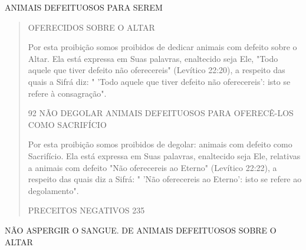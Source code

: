 ANIMAIS DEFEITUOSOS PARA SEREM

\begin{quote}
OFERECIDOS SOBRE O ALTAR

Por esta proibição somos proibidos de dedicar animais com defeito sobre
o Altar. Ela está expressa em Suas palavras, enaltecido seja Ele, "Todo
aquele que tiver defeito não oferecereis" (Levítico 22:20), a respeito
das quais a Sifrá diz: " 'Todo aquele que tiver defeito não
oferecereis': isto se refere à consagração".

92 NÃO DEGOLAR ANIMAIS DEFEITUOSOS PARA OFERECÊ-LOS COMO SACRIFÍCIO

Por esta proibição somos proibidos de degolar: animais com defeito como
Sacrifício. Ela está expressa em Suas palavras, enaltecido seja Ele,
relativas a animais com defeito "Não oferecereis ao Eterno" (Levítico
22:22), a respeito das quais diz a Sifrá: " 'Não oferecereis ao Eterno':
isto se refere ao degolamento".

PRECEITOS NEGATIVOS 235
\end{quote}

NÃO ASPERGIR O SANGUE. DE ANIMAIS DEFEITUOSOS SOBRE O ALTAR

